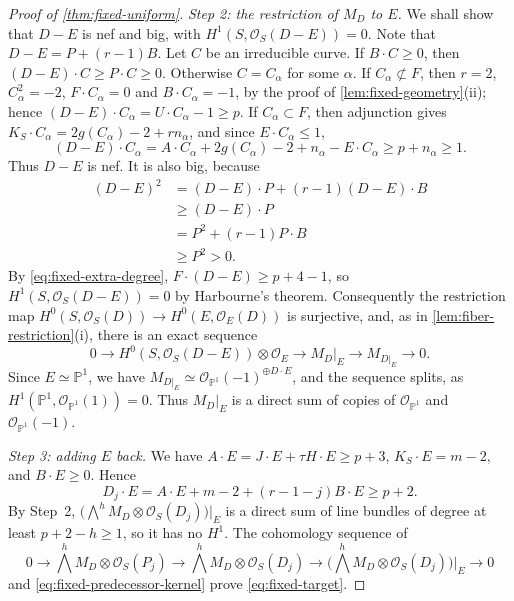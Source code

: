 \documentclass[11pt,reqno]{amsart}
\numberwithin{equation}{section}
\theoremstyle{remark}
\newcommand{\sshf}[1]{\mathcal{O}_{#1}}
\newcommand{\prj}[1]{\mathbb{P}^{#1}}
\begin{document}
\begin{proof}[Proof of \cref{thm:fixed-uniform}]
\smallskip\noindent\emph{Step 2: the restriction of \(M_D\) to \(E\).} We shall show that \(D-E\) is nef and big, with \(H^1(S,\sshf{S}(D-E))=0\). Note that \(D-E=P+(r-1)B\). Let \(C\) be an irreducible curve. If \(B\cdot C\geq0\), then \((D-E)\cdot C\geq P\cdot C\geq0\). Otherwise \(C=C_\alpha\) for some \(\alpha\). If \(C_\alpha\not\subset F\), then \(r=2\), \(C_\alpha^2=-2\), \(F\cdot C_\alpha=0\) and \(B\cdot C_\alpha=-1\), by the proof of \cref{lem:fixed-geometry}\textup{(ii)}; hence \((D-E)\cdot C_\alpha=U\cdot C_\alpha-1\geq p\). If \(C_\alpha\subset F\), then adjunction gives \(K_S\cdot C_\alpha=2g(C_\alpha)-2+rn_\alpha\), and since \(E\cdot C_\alpha\leq1\),
\[
 (D-E)\cdot C_\alpha=A\cdot C_\alpha+2g(C_\alpha)-2+n_\alpha-E\cdot C_\alpha\geq p+n_\alpha\geq1.
\]
Thus \(D-E\) is nef. It is also big, because
\begin{align*}
 (D-E)^2&=(D-E)\cdot P+(r-1)(D-E)\cdot B\\
 &\geq (D-E)\cdot P\\
 &=P^2+(r-1)P\cdot B\\
 &\geq P^2>0.
\end{align*}
By \eqref{eq:fixed-extra-degree}, \(F\cdot(D-E)\geq p+4-1\), so \(H^1(S,\sshf{S}(D-E))=0\) by Harbourne's theorem. Consequently the restriction map \(H^0(S,\sshf{S}(D))\to H^0(E,\sshf{E}(D))\) is surjective, and, as in \cref{lem:fiber-restriction}\textup{(i)}, there is an exact sequence
\[
 0\longrightarrow H^0(S,\sshf{S}(D-E))\otimes\sshf{E}\longrightarrow M_D|_E\longrightarrow M_{D|_E}\longrightarrow0.
\]
Since \(E\simeq\prj{1}\), we have \(M_{D|_E}\simeq\sshf{\prj{1}}(-1)^{\oplus D\cdot E}\), and the sequence splits, as \(H^1(\prj{1},\sshf{\prj{1}}(1))=0\). Thus \(M_D|_E\) is a direct sum of copies of \(\sshf{\prj{1}}\) and \(\sshf{\prj{1}}(-1)\).

\smallskip\noindent\emph{Step 3: adding \(E\) back.} We have \(A\cdot E=J\cdot E+\tau H\cdot E\geq p+3\), \(K_S\cdot E=m-2\), and \(B\cdot E\geq0\). Hence
\[
 D_j\cdot E=A\cdot E+m-2+(r-1-j)B\cdot E\geq p+2.
\]
By Step~2, \(\bigl(\bigwedge^hM_D\otimes\sshf{S}(D_j)\bigr)|_E\) is a direct sum of line bundles of degree at least \(p+2-h\geq1\), so it has no \(H^1\). The cohomology sequence of
\[
 0\longrightarrow\textstyle\bigwedge^hM_D\otimes\sshf{S}(P_j)\longrightarrow\bigwedge^hM_D\otimes\sshf{S}(D_j)\longrightarrow\bigl(\bigwedge^hM_D\otimes\sshf{S}(D_j)\bigr)|_E\longrightarrow0
\]
and \eqref{eq:fixed-predecessor-kernel} prove \eqref{eq:fixed-target}.
\end{proof}
\end{document}
